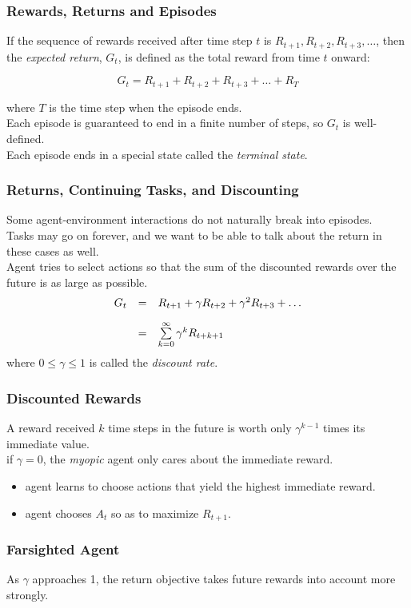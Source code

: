 \documentclass[12pt]{beamer}
\newcommand{\nl}{\vspace*{1em}\\}
\begin{document}
\begin{frame}\frametitle{Rewards, Returns and Episodes}
    If the sequence of rewards received after time step $t$ is $R_{t+1}, R_{t+2}, R_{t+3}, \ldots$,
    then the \textit{expected return}, $G_t$, is defined as the total reward from time $t$ onward:

    $$
        G_t = R_{t+1} + R_{t+2} + R_{t+3} + \ldots + R_T
    $$

    where $T$ is the time step when the episode ends.\nl
    Each episode is guaranteed to end in a finite number of steps, so $G_t$ is well-defined.\nl
    Each episode ends in a special state called the \textit{terminal state}.
\end{frame}


\begin{frame}\frametitle{Returns, Continuing Tasks, and Discounting}
    Some agent-environment interactions do not naturally break into episodes.\nl
    Tasks may go on forever, and we want to be able to talk about the return in these cases as well.\nl
    Agent tries to select actions so that the sum of the discounted rewards over
    the future is as large as possible.\nl
    $$
    \begin{array}{rll}
        G_t &=& R_{t+1} + \gamma R_{t+2} + \gamma^2 R_{t+3} + \ldots \nl
            &=& \sum\limits_{k=0}^{\infty} \gamma^k R_{t+k+1}
    \end{array}
    $$
    where $0 \le \gamma \le 1$ is called the \textit{discount rate}.
\end{frame}


\begin{frame}\frametitle{Discounted Rewards}
    A reward received $k$ time steps in the future is worth only $\gamma^{k-1}$ times its immediate value.\nl
    if $\gamma = 0$, the \textit{myopic} agent only cares about the immediate reward.\nl
    \begin{itemize}
        \item agent learns to choose actions that yield the highest immediate reward.
        \item agent chooses $A_t$ so as to maximize $R_{t+1}$.
    \end{itemize}
\end{frame}

\begin{frame}\frametitle{Farsighted Agent}
    As $\gamma$ approaches 1, the return objective takes future rewards into account more strongly.\nl
\end{frame}
\end{document}
